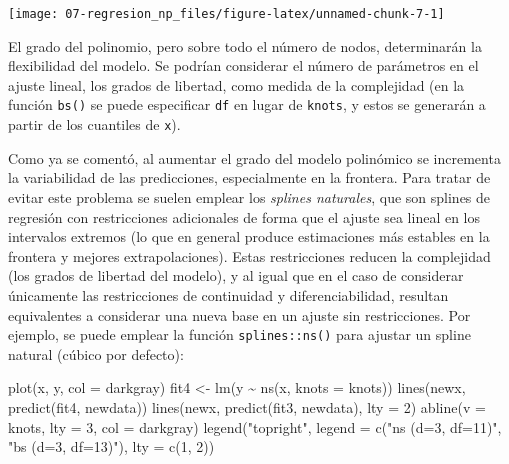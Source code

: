 \documentclass[
  spanish,
]{book}
\newenvironment{Shaded}{\begin{snugshade}}{\end{snugshade}}
\newcommand{\AttributeTok}[1]{\textcolor[rgb]{0.77,0.63,0.00}{#1}}
\newcommand{\DecValTok}[1]{\textcolor[rgb]{0.00,0.00,0.81}{#1}}
\newcommand{\FunctionTok}[1]{\textcolor[rgb]{0.00,0.00,0.00}{#1}}
\newcommand{\NormalTok}[1]{#1}
\newcommand{\OtherTok}[1]{\textcolor[rgb]{0.56,0.35,0.01}{#1}}
\newcommand{\SpecialCharTok}[1]{\textcolor[rgb]{0.00,0.00,0.00}{#1}}
\newcommand{\StringTok}[1]{\textcolor[rgb]{0.31,0.60,0.02}{#1}}
\theoremstyle{break}
\theoremstyle{definition}
\theoremstyle{definition}
\theoremstyle{definition}
\theoremstyle{definition}
\theoremstyle{remark}
\begin{document}
\begin{center}\texttt{[image: 07-regresion\_np\_files/figure-latex/unnamed-chunk-7-1]} \end{center}

El grado del polinomio, pero sobre todo el número de nodos, determinarán la flexibilidad del modelo.
Se podrían considerar el número de parámetros en el ajuste lineal, los grados de libertad, como medida de la complejidad (en la función \texttt{bs()} se puede especificar \texttt{df} en lugar de \texttt{knots}, y estos se generarán a partir de los cuantiles de \texttt{x}).

Como ya se comentó, al aumentar el grado del modelo polinómico se incrementa la variabilidad de las predicciones, especialmente en la frontera.
Para tratar de evitar este problema se suelen emplear los \emph{splines naturales}, que son splines de regresión con restricciones adicionales de forma que el ajuste sea lineal en los intervalos extremos (lo que en general produce estimaciones más estables en la frontera y mejores extrapolaciones).
Estas restricciones reducen la complejidad (los grados de libertad del modelo), y al igual que en el caso de considerar únicamente las restricciones de continuidad y diferenciabilidad, resultan equivalentes a considerar una nueva base en un ajuste sin restricciones.
Por ejemplo, se puede emplear la función \texttt{splines::ns()} para ajustar un spline natural (cúbico por defecto):

\begin{Shaded}
\begin{Highlighting}[]
\FunctionTok{plot}\NormalTok{(x, y, }\AttributeTok{col =} \StringTok{\textquotesingle{}darkgray\textquotesingle{}}\NormalTok{)}
\NormalTok{fit4 }\OtherTok{\textless{}{-}} \FunctionTok{lm}\NormalTok{(y }\SpecialCharTok{\textasciitilde{}} \FunctionTok{ns}\NormalTok{(x, }\AttributeTok{knots =}\NormalTok{ knots))}
\FunctionTok{lines}\NormalTok{(newx, }\FunctionTok{predict}\NormalTok{(fit4, newdata))}
\FunctionTok{lines}\NormalTok{(newx, }\FunctionTok{predict}\NormalTok{(fit3, newdata), }\AttributeTok{lty =} \DecValTok{2}\NormalTok{)}
\FunctionTok{abline}\NormalTok{(}\AttributeTok{v =}\NormalTok{ knots, }\AttributeTok{lty =} \DecValTok{3}\NormalTok{, }\AttributeTok{col =} \StringTok{\textquotesingle{}darkgray\textquotesingle{}}\NormalTok{)}
\FunctionTok{legend}\NormalTok{(}\StringTok{"topright"}\NormalTok{, }\AttributeTok{legend =} \FunctionTok{c}\NormalTok{(}\StringTok{"ns (d=3, df=11)"}\NormalTok{, }\StringTok{"bs (d=3, df=13)"}\NormalTok{), }\AttributeTok{lty =} \FunctionTok{c}\NormalTok{(}\DecValTok{1}\NormalTok{, }\DecValTok{2}\NormalTok{))}
\end{Highlighting}
\end{Shaded}
\end{document}
